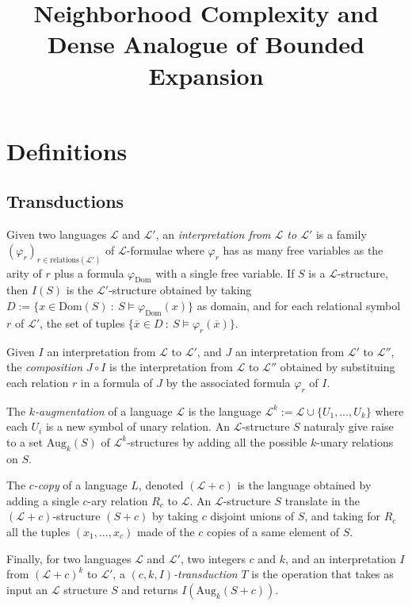 \documentclass[11pt]{article}
\theoremstyle{definition}
\newcommand{\Ll}{\mathcal L}
\newcommand{\Dom}{\text{Dom}}
\newcommand{\remph}[1]{{\color{red} \emph{#1}}}
\newcommand{\Aug}{\text{Aug}}
\begin{document}
\title{Neighborhood Complexity and Dense Analogue of Bounded Expansion}
\date{}
\maketitle

\section{Definitions}

\subsection{Transductions}
Given two languages $\Ll$ and $\Ll'$,
an \remph{interpretation from $\Ll$ to $\Ll'$} is
a family $(\varphi_r)_{r \in \text{relations}(\Ll')}$ of $\Ll$-formulae where $\varphi_r$ has as many free variables as the arity of $r$ plus a formula $\varphi_{\Dom}$ with a single free variable.
If $S$ is a $\Ll$-structure, then \remph{$I(S)$} is the $\Ll'$-structure obtained by taking $D := \{x \in \Dom(S)~:~S \models \varphi_{\Dom}(x)\}$ as domain, and for each relational symbol $r$ of $\Ll'$, the set of tuples
$\{\overline x \in D~:~S \models \varphi_r(\overline x)\}$. 

Given $I$ an interpretation from $\Ll$ to $\Ll'$,
and $J$ an interpretation from $\Ll'$ to $\Ll''$, the \remph{composition $J \circ I$} is the interpretation from $\Ll$ to $\Ll''$ obtained by substituing each relation $r$ in a formula of $J$ by the associated formula $\varphi_r$ of $I$.

The \remph{$k$-augmentation} of a language $\Ll$ is the language
$\Ll^k := \Ll \cup \{U_1, \dots, U_k\}$ where each $U_i$ is a new symbol of unary relation.
An $\Ll$-structure $S$ naturaly give raise to a set \remph{$\Aug_k(S)$} of $\Ll^k$-structures by adding all the possible $k$-unary relations on $S$.

The \remph{$c$-copy} of a language $L$, denoted $(\Ll + c)$ is the language obtained by adding a single $c$-ary relation $R_c$ to $\Ll$.
An $\Ll$-structure $S$ translate in the $(\Ll + c)$-structure $(S + c)$ by taking $c$ disjoint unions of $S$, and taking for $R_c$ all the tuples $(x_1, \ldots, x_c)$ made of the $c$ copies of a same element of $S$.

Finally, for two languages $\Ll$ and $\Ll'$, two integers $c$ and $k$, and an interpretation $I$ from $(\Ll + c)^k$ to $\Ll'$, a \remph{$(c, k, I)$-transduction} $T$ is the operation that takes as input an $\Ll$ structure $S$ and returns $I(\Aug_k(S + c))$.
\end{document}
